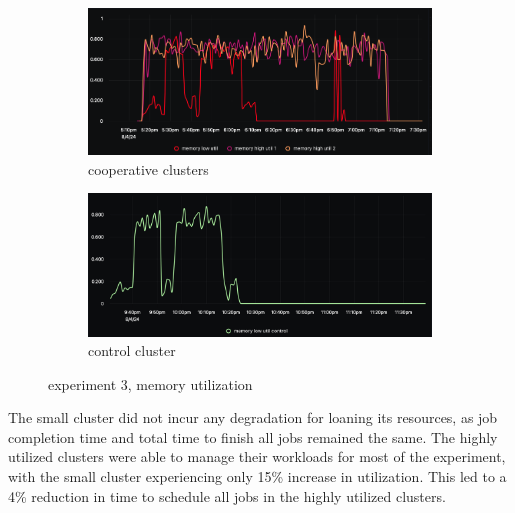 \begin{figure}[H]
\centering
\begin{subfigure}{.5\textwidth}
  \centering
  \includegraphics[width=.9\linewidth]{./figures/experiment-three/cooperative.png}
  \caption{cooperative clusters}
  \label{fig:exp3coop}
\end{subfigure}%
\begin{subfigure}{.5\textwidth}
  \centering
  \includegraphics[width=.9\linewidth]{./figures/experiment-three/control.png}
  \caption{control cluster}
  \label{fig:exp3control}
\end{subfigure}
\caption{experiment 3, memory utilization}
\label{fig:exp3memutil}
\end{figure}

The small cluster did not incur any degradation for loaning its resources, as
job completion time and total time to finish all jobs remained the same. The
highly utilized clusters were able to manage their workloads for most of the
experiment, with the small cluster experiencing only 15\% increase in
utilization. This led to a  4\% reduction in time to schedule all jobs in the
highly utilized clusters. 



%
%
